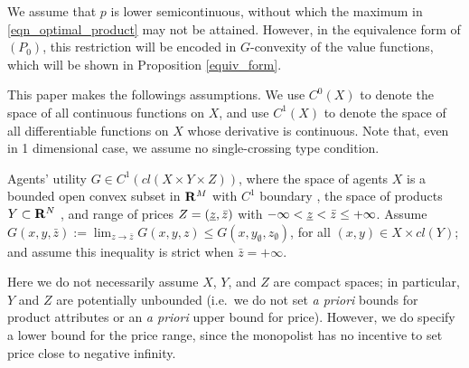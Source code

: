We assume that $p$ is lower semicontinuous, without which the maximum in \eqref{eqn_optimal_product} may not be attained. However, in the equivalence form of $(P_0)$, this restriction will be encoded in $G$-convexity of the value functions, which will be shown in Proposition \ref{equiv_form}.\medskip


This paper makes the followings assumptions. {We use $C^0(X)$ to denote the space of all continuous functions on $X$, and use $C^1(X)$ to denote the space of all differentiable functions on $X$ whose derivative is continuous.} Note that, even in 1 dimensional case, we assume no single-crossing type condition.\medskip%




\begin{assumption}\label{assmp:Gregular}
	Agents' utility $G \in C^{1}(cl(X\times Y \times Z))$, where the space of agents $X$ is a bounded open convex subset in ${\mathbf R}^M$ with $C^1$ boundary%
	, the space of products $Y \subset {\mathbf R}^N$%
	, and range of prices $Z=(\munderbar z,\bar z)$ with $-\infty < \munderbar z < \bar z \le +\infty$. {Assume $G(x,y,\bar{z}) := \lim_{z\longrightarrow \bar{z}} G(x,y,z) \le G(x, y_{\emptyset}, z_{\emptyset})$, for all $(x,y) \in X \times cl(Y)$; and assume this inequality is strict when $\bar{z} = +\infty$.}
\end{assumption}



Here we do not necessarily assume $X$, $Y$, and $Z$ are compact spaces; in particular, $Y$ and $Z$ are potentially unbounded %
(i.e.\ we do not set  \textit{a priori} bounds for product attributes or an \textit{a priori} upper bound for price). However, we do specify a lower bound for the price range, since the monopolist has no incentive to set price close to negative infinity. %
\medskip



